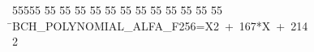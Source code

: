 %
%
\begin{tabbing}
55555 \= 55 \= 55 \= 55 \= 55 \= 55 \= 55 \= 55 \= 55 \= 55 \= 55 \= 55 \= 55 \= \>BCH\_POLYNOMIAL\_ALFA\_F256=X2\ +\ 167*X\ +\ 214\\[0pt]
2\>\end{tabbing}
